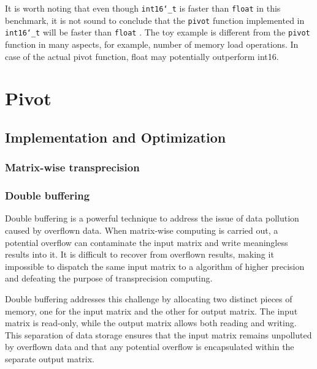 \documentclass[logo,bsc,singlespacing,parskip]{infthesis}
\newcommand{\dtshort}{\texttt{int16\char`_t} }
\newcommand{\dtfloat}{\texttt{float} }
\newcommand{\pivot}{\texttt{pivot} }
\begin{document}
It is worth noting that even though \dtshort is faster than \dtfloat in this
benchmark, it is not sound to conclude that the \texttt{pivot} function
implemented in \dtshort will be faster than \dtfloat. The toy example is
different from the \pivot function in many aspects, for example, number of
memory load operations. In case of the actual pivot function, float may
potentially outperform int16. 




\chapter{Pivot}

\section{Implementation and Optimization}

\subsection{Matrix-wise transprecision}

\subsection{Double buffering}

Double buffering is a powerful technique to address the issue of data pollution
caused by overflown data. When matrix-wise computing is carried out, a potential
overflow can contaminate the input matrix and write meaningless results into it.
It is difficult to recover from overflown results, making it impossible to
dispatch the same input matrix to a algorithm of higher precision and defeating
the purpose of transprecision computing.

Double buffering addresses this challenge by allocating two distinct pieces of
memory, one for the input matrix and the other for output matrix. The input
matrix is read-only, while the output matrix allows both reading and writing.
This separation of data storage ensures that the input matrix remains unpolluted
by overflown data and that any potential overflow is encapsulated within the
separate output matrix. 
\end{document}
